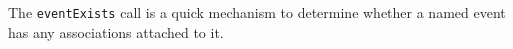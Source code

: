 The \verb+eventExists+ call is a quick mechanism to determine whether a named event has any associations attached to it.
